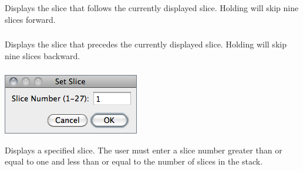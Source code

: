 \subsubsection{\protect{}\label{sub:Next-Slice-[>]}}

Displays the slice that follows the currently displayed slice. Holding
 \mykeystroke{>} will skip nine slices forward.




\subsubsection{\protect{}\label{sub:Previous-Slice-[>]}}

Displays the slice that precedes the currently displayed slice. Holding
 \mykeystroke{<} will skip nine slices backward.




\subsubsection{\protect{}\label{sub:Set-Slice...}}

\begin{minipage}[c][1\totalheight][t]{0.33\columnwidth}%
\includegraphics[scale=0.55]{images/SetSlice}%
\end{minipage}%
\begin{minipage}[c][1\totalheight][t]{0.67\columnwidth}%
Displays a specified slice. The user must enter a slice number greater
than or equal to one and less than or equal to the number of slices
in the stack.%
\end{minipage}


\subsubsection{\protect{}\label{sub:Images-To-Stack}}

